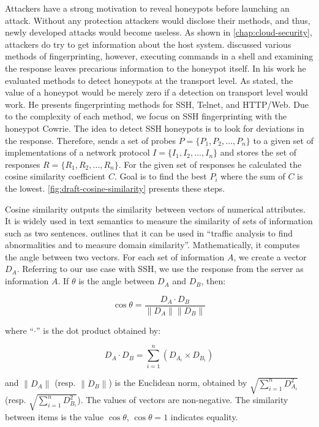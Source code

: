 Attackers have a strong motivation to reveal honeypots before launching an attack.
Without any protection attackers would disclose their methods, and thus, newly developed attacks would become useless.
As shown in \autoref{chap:cloud-security}, attackers do try to get information about the host system.
\citet{vetterl2020} discussed various methods of fingerprinting, however, executing commands in a shell and examining the response leaves precarious information to the honeypot itself.
In his work he evaluated methods to detect honeypots at the transport level.
As stated, the value of a honeypot would be merely zero if a detection on transport level would work.
He presents fingerprinting methods for SSH, Telnet, and HTTP/Web.
Due to the complexity of each method, we focus on SSH fingerprinting with the honeypot Cowrie.
The idea to detect SSH honeypots is to look for deviations in the response.
Therefore, \citet{vetterl2020} sends a set of probes $P = \{P_1, P_2, \dots, P_n\}$ to a given set of implementations of a network protocol $I = \{I_1, I_2, \dots, I_n\}$ and stores the set of responses $R = \{R_1, R_2, \dots, R_n\}$.
For the given set of responses he calculated the cosine similarity coefficient $C$.
Goal is to find the best $P_i$ where the sum of $C$ is the lowest.
\autoref{fig:draft-cosine-similarity} presents these steps.

Cosine similarity outputs the similarity between vectors of numerical attributes.
It is widely used in text semantics to measure the similarity of sets of information such as two sentences.
\citet{vetterl2020} outlines that it can be used in \enquote{traffic analysis to find abnormalities and to measure domain similarity}.
Mathematically, it computes the angle between two vectors.
For each set of information $A$, we create a vector $D_A$.
Referring to our use case with SSH, we use the response from the server as information $A$.
If $\theta$ is the angle between $D_A$ and $D_B$, then:

\begin{equation} \label{eq:cosine-similarity}
    \cos \theta = \frac{D_A \cdot D_B}{\|D_A\| \|D_B\|}
\end{equation}

where \enquote{$\cdot$} is the dot product obtained by:

\begin{equation}
    D_A \cdot D_B = \sum_{i=1}^{n} (D_{A_i} \times D_{B_i})
\end{equation}

and $\|D_A\|$ (resp. $\|D_B\|$) is the Euclidean norm, obtained by $\sqrt{\sum_{i=1}^{n} D_{A_i}^2}$ (resp. $\sqrt{\sum_{i=1}^{n} D_{B_i}^2}$).
The values of vectors are non-negative. The similarity between items is the value $\cos \theta$, $\cos \theta = 1$ indicates equality.

